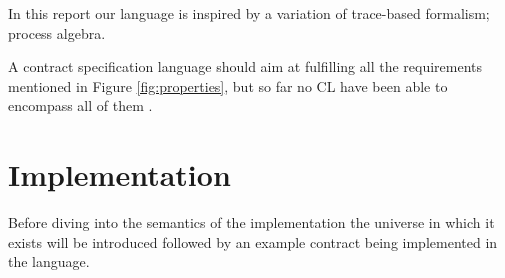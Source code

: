 \documentclass{ituthesis}
\begin{document}
In this report our language is inspired by a variation of trace-based formalism; process algebra.

A contract specification language should aim at fulfilling all the requirements mentioned in Figure \ref{fig:properties}, but so far no CL have been able to encompass all of them \cite{hvitved2011contract}.


\chapter{Implementation}

Before diving into the semantics of the implementation the universe in which it exists will be introduced followed by an example contract being implemented in the language.
\end{document}

